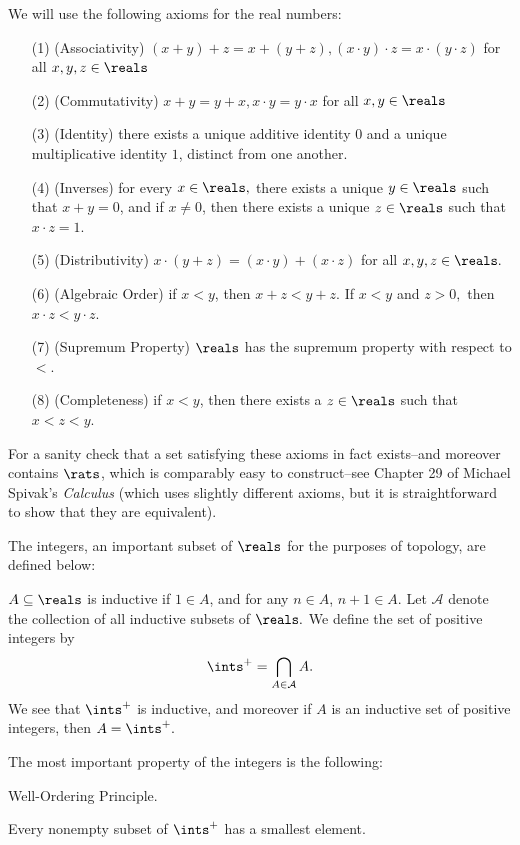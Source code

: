 We will use the following axioms for the real numbers:
\begin{enumerate}
    \item[(1)] (Associativity) $(x+y) + z = x + (y+z), (x \cdot y) \cdot z = x \cdot (y \cdot z)$ for all $x, y, z \in \reals$
    \item[(2)] (Commutativity) $x+y = y+x, x \cdot y = y \cdot x$ for all $x, y \in \reals$
    \item[(3)] (Identity) there exists a unique additive identity $0$ and a unique multiplicative identity $1$, distinct from one another.
    \item[(4)] (Inverses) for every $x \in \reals,$ there exists a unique $y \in \reals$ such that $x + y = 0$, and if $x \neq 0$, then there exists a unique $z \in \reals$ such that $x \cdot z = 1$.
    \item[(5)] (Distributivity) $x\cdot (y+z) = (x \cdot y) + (x \cdot z)$ for all $x, y, z \in \reals.$
    \item[(6)] (Algebraic Order) if $x < y$, then $x +z < y+z$. If $x < y$ and $z > 0,$ then $x \cdot z < y \cdot z$.
    \item[(7)] (Supremum Property) $\reals$ has the supremum property with respect to $<$.
    \item[(8)] (Completeness) if $x < y$, then there exists a $z \in \reals$ such that $x < z< y$.
\end{enumerate}

For a sanity check that a set satisfying these axioms in fact exists--and moreover contains $\rats$, which is comparably easy to construct--see Chapter 29 of Michael Spivak's {\it Calculus} (which uses slightly different axioms, but it is straightforward to show that they are equivalent).

The integers, an important subset of $\reals$ for the purposes of topology, are defined below:
\begin{definition}\label{1.6}
    $A \subseteq \reals$ is inductive if $1 \in A$, and for any $n \in A$, $n+1 \in A$. Let $\mathcal{A}$ denote the collection of all inductive subsets of $\reals.$ We define the set of positive integers by
    $$\ints^+ = \bigcap_{A \in \mathcal{A}} A.$$
    We see that $\ints^+$ is inductive, and moreover if $A$ is an inductive set of positive integers, then $A = \ints^+.$
\end{definition}
The most important property of the integers is the following:
\begin{theorem}\label{1.7}
    Well-Ordering Principle.
    \vspace{10pt}
    
    Every nonempty subset of $\ints^+$ has a smallest element.
\end{theorem}

